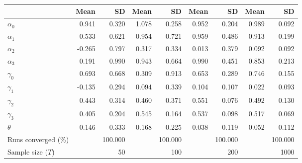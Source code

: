 
\begin{tabular}[t]{lrrrrrrrr}
\toprule
  & Mean & SD & Mean  & SD  & Mean   & SD   & Mean    & SD   \\
\midrule
$\alpha_{0}$ & 0.941 & 0.320 & 1.078 & 0.258 & 0.952 & 0.204 & 0.989 & 0.092\\
$\alpha_{1}$ & 0.533 & 0.621 & 0.954 & 0.721 & 0.959 & 0.486 & 0.913 & 0.199\\
$\alpha_{2}$ & -0.265 & 0.797 & 0.317 & 0.334 & 0.013 & 0.379 & 0.092 & 0.092\\
$\alpha_{3}$ & 0.191 & 0.990 & 0.943 & 0.664 & 0.990 & 0.451 & 0.853 & 0.213\\
$\gamma_{0}$ & 0.693 & 0.668 & 0.309 & 0.913 & 0.653 & 0.289 & 0.746 & 0.155\\
$\gamma_{1}$ & -0.135 & 0.294 & 0.094 & 0.339 & 0.104 & 0.107 & 0.022 & 0.093\\
$\gamma_{2}$ & 0.443 & 0.314 & 0.460 & 0.371 & 0.551 & 0.076 & 0.492 & 0.130\\
$\gamma_{3}$ & 0.405 & 0.204 & 0.545 & 0.164 & 0.537 & 0.098 & 0.517 & 0.069\\
$\theta$ & 0.146 & 0.333 & 0.168 & 0.225 & 0.038 & 0.119 & 0.052 & 0.112\\
Runs converged (\%) &  & 100.000 &  & 100.000 &  & 100.000 &  & 100.000\\
Sample size ($T$) &  & 50 &  & 100 &  & 200 &  & 1000\\
\bottomrule
\end{tabular}
